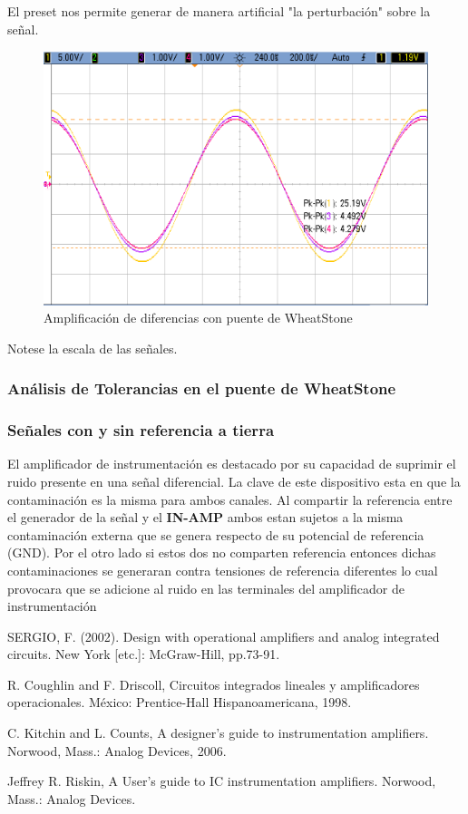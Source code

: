 \documentclass[a4paper]{article}
\begin{document}
El preset nos permite generar de manera artificial "la perturbación" sobre la señal.

\begin{figure}[H]
	\centering
	\includegraphics[height=0.3\textheight]{../ImagenesDeOsciloscopio/WheatStone1tierra1c1R.png}
	\caption{Amplificación de diferencias con puente de WheatStone}
\end{figure}
Notese la escala de las señales.
\subsubsection{Análisis de Tolerancias en el puente de WheatStone}


\subsubsection{Señales con y sin referencia a tierra}
El amplificador de instrumentación es destacado por su capacidad de suprimir el ruido presente en una señal diferencial. La clave de este dispositivo esta en que la contaminación es la misma para ambos canales.
Al compartir la referencia entre el generador de la señal y el \textbf{IN-AMP} ambos estan sujetos a la misma contaminación externa que se genera respecto de su potencial de referencia (GND). Por el otro lado si estos dos no comparten referencia entonces dichas contaminaciones se generaran contra tensiones de referencia diferentes lo cual provocara que se adicione al ruido en las terminales del amplificador de instrumentación  



 	
\begin{thebibliography}{9}
	
	SERGIO, F. (2002). Design with operational amplifiers and analog integrated circuits. New York [etc.]: McGraw-Hill, pp.73-91.	
	
	R. Coughlin and F. Driscoll, Circuitos integrados lineales y amplificadores operacionales. México: Prentice-Hall Hispanoamericana, 1998.
	
	C. Kitchin and L. Counts, A designer's guide to instrumentation amplifiers. Norwood, Mass.: Analog Devices, 2006.
	
	Jeffrey R. Riskin, A User's guide to IC instrumentation amplifiers. Norwood, Mass.: Analog Devices.
	
\end{thebibliography}
\end{document}
